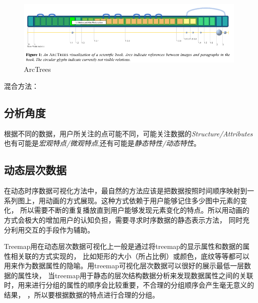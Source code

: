 \documentclass{article}
\begin{document}
\begin{figure}[h]
	\centering
	\includegraphics[width=\textwidth]{_img/ArcTrees_.png}
	\caption{ArcTrees\cite{neumann2005arctrees}}
	\label{fig:arctrees}
\end{figure}

混合方法：

\subsection{分析角度}
根据不同的数据，用户所关注的点可能不同，可能关注数据的\emph{Structure/Attributes}
也有可能是\emph{宏观特点/微观特点},还有可能是\emph{静态特性/动态特性}。

\subsection{动态层次数据}
在动态时序数据可视化方法中，最自然的方法应该是把数据按照时间顺序映射到一系列图上，用动画的方式展现。这种方式依赖于用户能够记住多少图中元素的变化，
所以需要不断的重复播放直到用户能够发现元素变化的特点。所以用动画的方式会极大的增加用户的认知负担，需要寻求时序数据的静态表示方法，
同时充分利用交互的手段作为辅助。

Treemap用在动态层次数据可视化上一般是通过将treemap的显示属性和数据的属性相关联的方式实现的，
比如矩形的大小（所占比例）或颜色，底纹等等都可以用来作为数据属性的隐喻。用treemap可视化层次数据可以很好的展示最低一层数据的属性块，
当treemap用于静态的层次结构数据分析来发现数据属性之间的关联时，用来进行分组的属性的顺序会比较重要，不合理的分组顺序会产生毫无意义的结果，
，所以要根据数据的特点进行合理的分组。
\end{document}
